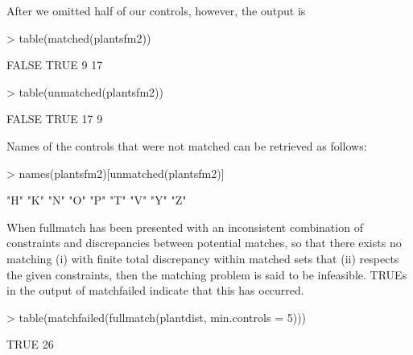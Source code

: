 \documentclass[12pt,twoside]{article}
\begin{document}
{{{{
\textrm{After we omitted half of our controls, however, the output is}}

\begin{Schunk}
\begin{Sinput}
> table(matched(plantsfm2))
\end{Sinput}
\begin{Soutput}
FALSE  TRUE 
    9    17 
\end{Soutput}
\begin{Sinput}
> table(unmatched(plantsfm2))
\end{Sinput}
\begin{Soutput}
FALSE  TRUE 
   17     9 
\end{Soutput}
\end{Schunk}

{\ttfamily
\textrm{Names of the controls that were not matched can be
  retrieved as follows:}}


\bigskip

\begin{Schunk}
\begin{Sinput}
> names(plantsfm2)[unmatched(plantsfm2)]
\end{Sinput}
\begin{Soutput}
[1] "H" "K" "N" "O" "P" "T" "V" "Y" "Z"
\end{Soutput}
\end{Schunk}

\bigskip

{\ttfamily
 \textrm{When }fullmatch\textrm{ has been presented with an inconsistent
combination of constraints and discrepancies between potential matches,
so that there exists no matching (i) with finite total discrepancy
within matched sets that (ii) respects the given constraints, then the
matching problem is said to be infeasible. }TRUE\textrm{s in the output
of }matchfailed\textrm{ indicate that this has occurred. }}


\begin{Schunk}
\begin{Sinput}
> table(matchfailed(fullmatch(plantdist, min.controls = 5)))
\end{Sinput}
\begin{Soutput}
TRUE 
  26 
\end{Soutput}
\end{Schunk}


}}}
\end{document}
